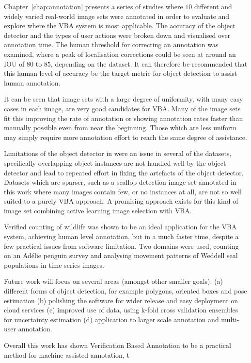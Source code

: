Chapter~\ref{chap:annotation} presents a series of studies where $10$ different and widely varied real-world image sets were annotated in order to evaluate and explore where the \gls{VBA} system is most applicable. The accuracy of the object detector and the types of user actions were broken down and visualised over annotation time. The human threshold for correcting an annotation was examined, where a peak of localisation corrections could be seen at around an \gls{IOU} of $80$ to $85$, depending on the dataset. It can therefore be recommended that this human level of accuracy be the target metric for object detection to assist human annotation.

It can be seen that image sets with a large degree of uniformity, with many easy cases in each image, are very good candidates for \gls{VBA}. Many of the image sets fit this improving the rate of annotation or showing annotation rates faster than manually possible even from near the beginning. Those which are less uniform may simply require more annotation effort to reach the same degree of assistance. 

Limitations of the object detector in were an issue in several of the datasets, specifically overlapping object instances are not handled well by the object detector and lead to repeated effort in fixing the artefacts of the object detector. Datasets which are sparser, such as a scallop detection image set annotated in this work where many images contain few, or no instances at all, are not so well suited to a purely \gls{VBA} approach. A promising approach exists for this kind of image set combining active learning image selection with \gls{VBA}.

Verified counting of wildlife was shown to be an ideal application for the \gls{VBA} system, achieving human level annotation, but in a much faster time, despite a few practical issues from software limitation. Two domains were used, counting on an Ad\'elie penguin survey and analysing movement patterns of Weddell seal populations in time series images.

Future work will focus on several areas (amongst other smaller goals): (a) different forms of object detection, for example polygons, oriented boxes and pose estimation (b) polishing the software for wider release and easy deployment on cloud services (c) improved use of data, using k-fold cross validation ensembles for uncertainty estimation (d) application to larger scale annotation and multi-user annotation.

Overall this work has shown Verification Based Annotation to be a practical method for machine assisted annotation, t  